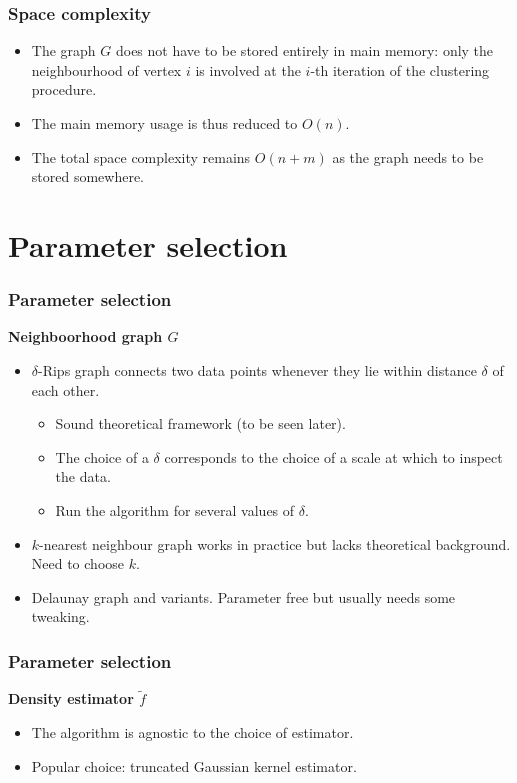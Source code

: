 \documentclass{beamer}
\theoremstyle{definition}
\begin{document}
\begin{frame}
\frametitle{Space complexity}
\begin{itemize}
\item<1-> The graph $G$ does not have to be stored entirely in main memory: only the neighbourhood of vertex $i$ is involved at the
$i$-th iteration of the clustering procedure. 

\item<2-> The main memory usage is thus reduced to $O(n)$.

\item<3-> The total space complexity remains $O(n + m)$ as the graph needs to be stored somewhere.
\end{itemize}
\end{frame}

\section{Parameter selection}
\begin{frame}
\frametitle{Parameter selection}
\textbf{Neighboorhood graph $G$}
\begin{itemize}
\item<1-> $\delta$-Rips graph connects two data points whenever they lie within distance $\delta$ of each other.
\begin{itemize}
\item<2-> Sound theoretical framework (to be seen later).
\item<3-> The choice of a $\delta$ corresponds to the choice of a scale at which to inspect the data.
\item<4-> Run the algorithm for several values of $\delta$. %
\end{itemize}
\item<5-> $k$-nearest neighbour graph works in practice but lacks theoretical background. Need to choose $k$.
\item<6-> Delaunay graph and variants. Parameter free but usually needs some tweaking.
\end{itemize}
\end{frame}

\begin{frame}
\frametitle{Parameter selection}
\textbf{Density estimator $\tilde{f}$}
\begin{itemize}
\item<1-> The algorithm is agnostic to the choice of estimator. 
\item<2-> Popular choice: truncated Gaussian kernel estimator. %
\end{itemize}
\end{frame}
\end{document}
